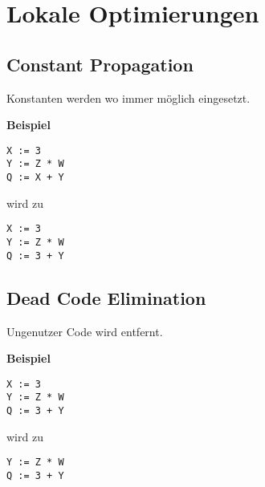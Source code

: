 \section{Lokale Optimierungen}

\subsection{Constant Propagation}

Konstanten werden wo immer möglich eingesetzt.

\textbf{Beispiel}
%
\begin{verbatim}
X := 3
Y := Z * W
Q := X + Y
\end{verbatim}
%
wird zu
%
\begin{verbatim}
X := 3
Y := Z * W
Q := 3 + Y
\end{verbatim}

\subsection{Dead Code Elimination}

Ungenutzer Code wird entfernt.

\textbf{Beispiel}
%
\begin{verbatim}
X := 3
Y := Z * W
Q := 3 + Y
\end{verbatim}
%
wird zu
%
\begin{verbatim}
Y := Z * W
Q := 3 + Y
\end{verbatim}
